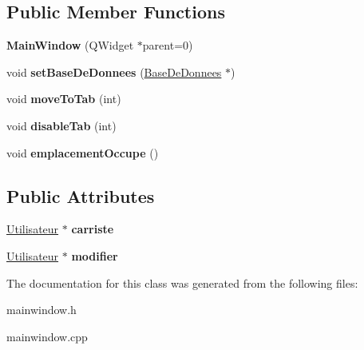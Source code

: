 \subsection*{Public Member Functions}
\begin{DoxyCompactItemize}
\item 
\mbox{\label{class_main_window_a8b244be8b7b7db1b08de2a2acb9409db}} 
{\bfseries Main\+Window} (Q\+Widget $\ast$parent=0)
\item 
\mbox{\label{class_main_window_a819bd562262c9bc43627a54b6748c0c4}} 
void {\bfseries set\+Base\+De\+Donnees} (\mbox{\hyperlink{class_base_de_donnees}{Base\+De\+Donnees}} $\ast$)
\item 
\mbox{\label{class_main_window_ad98be47de90e967d8b5a51b4815f4c94}} 
void {\bfseries move\+To\+Tab} (int)
\item 
\mbox{\label{class_main_window_acab91acedfd3b1960f1b1ece3cf22e56}} 
void {\bfseries disable\+Tab} (int)
\item 
\mbox{\label{class_main_window_ab8fa5a39e7f05994836571a2608ff852}} 
void {\bfseries emplacement\+Occupe} ()
\end{DoxyCompactItemize}
\subsection*{Public Attributes}
\begin{DoxyCompactItemize}
\item 
\mbox{\label{class_main_window_afcb22251b55d008d21b1889bab07863d}} 
\mbox{\hyperlink{class_utilisateur}{Utilisateur}} $\ast$ {\bfseries carriste}
\item 
\mbox{\label{class_main_window_ad4aa55759e60f34a25a8e79dfc8f9bcc}} 
\mbox{\hyperlink{class_utilisateur}{Utilisateur}} $\ast$ {\bfseries modifier}
\end{DoxyCompactItemize}


The documentation for this class was generated from the following files\+:\begin{DoxyCompactItemize}
\item 
mainwindow.\+h\item 
mainwindow.\+cpp\end{DoxyCompactItemize}
